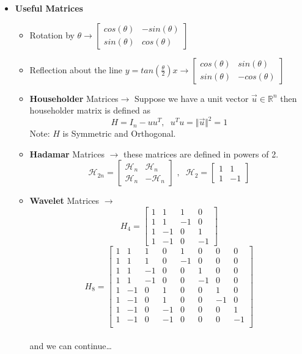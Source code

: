 \documentclass[a4paper]{article}
\numberwithin{equation}{section}
\begin{document}
\begin{itemize}
\item \textbf{Useful Matrices}
\begin{itemize}
    \item Rotation by $\theta \longrightarrow \begin{bmatrix}
        cos(\theta)&-sin(\theta)\\
        sin(\theta)&cos(\theta)
    \end{bmatrix}$
    \\
    \item Reflection about the line $y=tan(\frac{\theta}{2})x \rightarrow \begin{bmatrix}
        cos(\theta)&sin(\theta)\\
        sin(\theta)&-cos(\theta)
    \end{bmatrix}$
    \\
    \item \textbf{Householder} Matrices$\rightarrow$ Suppose we have a unit vector $\vec{u} \in \mathbb{R}^n $ then householder matrix is defined as \[H=I_n-uu^T ,\hspace{7pt} u^Tu=\Vert \vec{u} \Vert^2=1\]
    Note: $H$ is Symmetric and Orthogonal.\\
    \item \textbf{Hadamar} Matrices $\rightarrow$ these matrices are defined in powers of 2.
    \[\mathcal{H}_{2n}=\begin{bmatrix}
        \mathcal{H}_n&\mathcal{H}_n\\
        \mathcal{H}_n&-\mathcal{H}_n
    \end{bmatrix} \hspace{4pt},\hspace{7pt} \mathcal{H}_2=\begin{bmatrix}
        1&1\\1&-1
    \end{bmatrix}\]
    \item \textbf{Wavelet} Matrices $\rightarrow$ 
    \[H_4=\begin{bmatrix}
        1&1&1&0\\1&1&-1&0\\1&-1&0&1\\1&-1&0&-1
    \end{bmatrix}\]
    \[H_8=\begin{bmatrix}
        1&1&1&0&1&0&0&0\\
        1&1&1&0&-1&0&0&0\\
        1&1&-1&0&0&1&0&0\\
        1&1&-1&0&0&-1&0&0\\
        1&-1&0&1&0&0&1&0\\
        1&-1&0&1&0&0&-1&0\\
        1&-1&0&-1&0&0&0&1\\
        1&-1&0&-1&0&0&0&-1\\
    \end{bmatrix}\]
    \\
    and we can continue\dots
\end{itemize}


\end{itemize}
\end{document}
